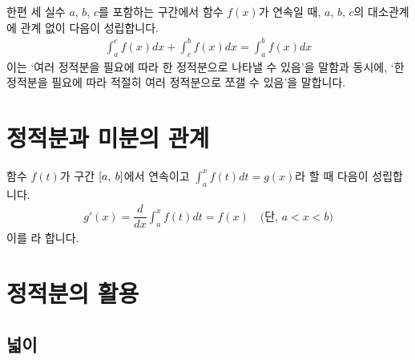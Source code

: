 한편 세 실수 $a$, $b$, $c$를 포함하는 구간에서 함수 $f\left( x \right) $가 연속일 때, $a$, $b$, $c$의 대소관계에 관계 없이 다음이 성립합니다.
\begin{align*}  \int_{a}^{c}f\left( x \right)dx + \int_{c}^{b}f\left( x \right)dx = \int_{a}^{b}f\left( x \right)dx  \end{align*}
이는 `여러 정적분을 필요에 따라 한 정적분으로 나타낼 수 있음'을 말함과 동시에, `한 정적분을 필요에 따라 적절히 여러 정적분으로 쪼갤 수 있음'을 말합니다. 

\section{정적분과 미분의 관계}
함수 $f\left( t \right) $가 구간 $\left[a,\: b\right]$에서 연속이고 $\int_{a}^{x}f\left( t \right)dt = g\left( x \right) $라 할 때 다음이 성립합니다.
\begin{align*}g'\left( x \right) = \dfrac{d}{dx}\int_{a}^{x}f\left( t \right) dt = f\left( x \right) \quad \text{(단, $a<x<b$)}\end{align*}
이를 라 합니다.%
\clearpage
\section{정적분의 활용}

\subsection{넓이}


